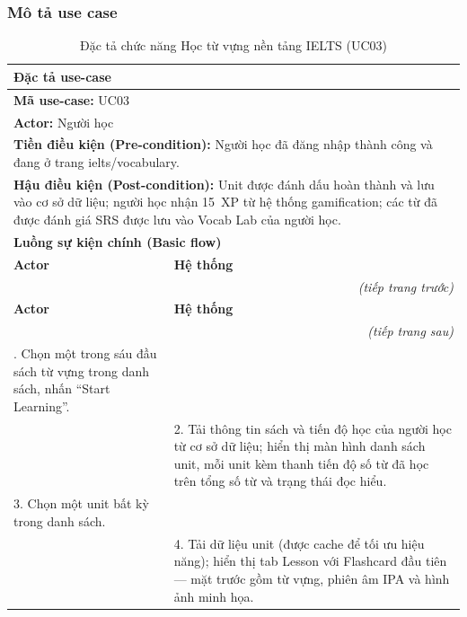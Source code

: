 \subsubsection{Mô tả use case}
\renewcommand{\arraystretch}{1.3}
\setlength{\tbu}{\dimexpr(\linewidth - 4\tabcolsep - 3\arrayrulewidth)/2\relax}
\begin{longtable}{|p{\tbu}|p{\tbu}|}
    \caption{Đặc tả chức năng Học từ vựng nền tảng IELTS (UC03)} \label{tab:uc03_spec} \\
    
    \hline
    \multicolumn{2}{|l|}{\textbf{Đặc tả use-case}} \\ \hline
    \multicolumn{2}{|l|}{\textbf{Mã use-case:} UC03} \\ \hline
    \multicolumn{2}{|l|}{\textbf{Actor:} Người học} \\ \hline
    \multicolumn{2}{|p{\dimexpr\linewidth - 2\tabcolsep - 2\arrayrulewidth\relax}|}{\textbf{Tiền điều kiện (Pre-condition):} Người học đã đăng nhập thành công và đang ở trang ielts/vocabulary.} \\ \hline
    \multicolumn{2}{|p{\dimexpr\linewidth - 2\tabcolsep - 2\arrayrulewidth\relax}|}{\textbf{Hậu điều kiện (Post-condition):} Unit được đánh dấu hoàn thành và lưu vào cơ sở dữ liệu; người học nhận 15~XP từ hệ thống gamification; các từ đã được đánh giá SRS được lưu vào Vocab Lab của người học.} \\ \hline
    \multicolumn{2}{|l|}{\textbf{Luồng sự kiện chính (Basic flow)}} \\ \hline
    \textbf{Actor} & \textbf{Hệ thống} \\ \hline
    \endfirsthead
    \multicolumn{2}{r}{\textit{(tiếp trang trước)}} \\
    \hline
    \textbf{Actor} & \textbf{Hệ thống} \\ \hline
    \endhead
    \hline
    \multicolumn{2}{r}{\textit{(tiếp trang sau)}} \\
    \endfoot
    \endlastfoot
    1. Chọn một trong sáu đầu sách từ vựng trong danh sách, nhấn ``Start Learning''. & \\ \hline
    & 2. Tải thông tin sách và tiến độ học của người học từ cơ sở dữ liệu; hiển thị màn hình danh sách unit, mỗi unit kèm thanh tiến độ số từ đã học trên tổng số từ và trạng thái đọc hiểu. \\ \hline
    3. Chọn một unit bất kỳ trong danh sách. & \\ \hline
    & 4. Tải dữ liệu unit (được cache để tối ưu hiệu năng); hiển thị tab Lesson với Flashcard đầu tiên --- mặt trước gồm từ vựng, phiên âm IPA và hình ảnh minh họa. \\ \hline

\end{longtable}

